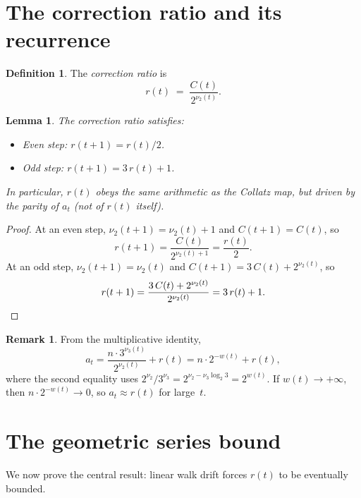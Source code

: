 \documentclass[11pt,a4paper]{article}
\theoremstyle{plain}
\newtheorem{lemma}[theorem]{Lemma}
\theoremstyle{definition}
\newtheorem{definition}[theorem]{Definition}
\newtheorem{remark}[theorem]{Remark}
\begin{document}
\section{The correction ratio and its recurrence}

\begin{definition}
The \emph{correction ratio} is
\[
  r(t) \;=\; \frac{C(t)}{2^{\nu_2(t)}}.
\]
\end{definition}

\begin{lemma}\label{lem:r-recurrence}
The correction ratio satisfies:
\begin{itemize}
  \item Even step: $r(t+1) = r(t)/2$.
  \item Odd step: $r(t+1) = 3\,r(t) + 1$.
\end{itemize}
In particular, $r(t)$ obeys the same arithmetic as the Collatz map,
but driven by the parity of $a_t$ (not of $r(t)$ itself).
\end{lemma}

\begin{proof}
At an even step, $\nu_2(t+1) = \nu_2(t) + 1$ and $C(t+1) = C(t)$, so
\[
  r(t+1) = \frac{C(t)}{2^{\nu_2(t)+1}} = \frac{r(t)}{2}.
\]
At an odd step, $\nu_2(t+1) = \nu_2(t)$ and
$C(t+1) = 3\,C(t) + 2^{\nu_2(t)}$, so
\[
  r(t+1) = \frac{3\,C(t) + 2^{\nu_2(t)}}{2^{\nu_2(t)}} = 3\,r(t) + 1. \qedhere
\]
\end{proof}

\begin{remark}\label{rem:a-equals-r}
From the multiplicative identity,
\[
  a_t = \frac{n \cdot 3^{\nu_3(t)}}{2^{\nu_2(t)}} + r(t)
  = n \cdot 2^{-w(t)} + r(t),
\]
where the second equality uses
$2^{\nu_2} / 3^{\nu_3} = 2^{\nu_2 - \nu_3 \log_2 3} = 2^{w(t)}$.
If $w(t) \to +\infty$, then $n \cdot 2^{-w(t)} \to 0$, so
$a_t \approx r(t)$ for large~$t$.
\end{remark}

\section{The geometric series bound}

We now prove the central result: linear walk drift forces $r(t)$
to be eventually bounded.
\end{document}
